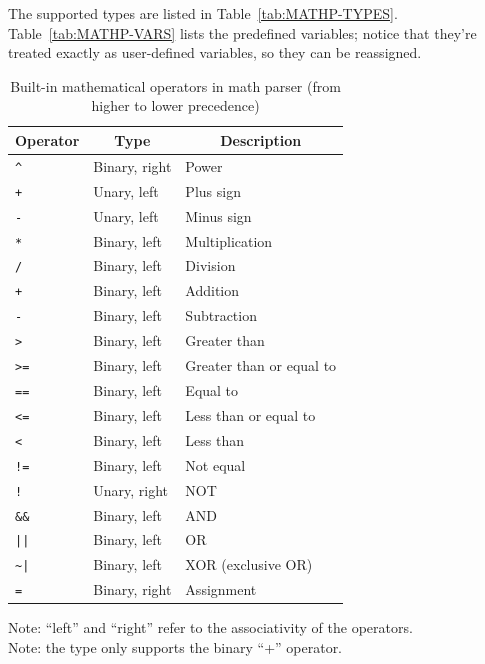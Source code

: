 The supported types are listed in Table~\ref{tab:MATHP-TYPES}.
Table~\ref{tab:MATHP-VARS} lists the predefined variables; notice
that they're treated exactly as user-defined variables, so they 
can be reassigned.

\begin{table}
	\begin{center}
	\caption{Built-in mathematical operators in math parser
	(from higher to lower precedence)}\label{tab:MATHP-OPERATORS}
	\begin{tabular}{lll}
		\hline
		\multicolumn{1}{c}{\textbf{Operator}} & 
		\multicolumn{1}{c}{\textbf{Type}} &
		\multicolumn{1}{c}{\textbf{Description}} \\
		\hline
		\texttt{\^} & Binary, right & Power \\
		\texttt{+} & Unary, left & Plus sign \\
		\texttt{-} & Unary, left & Minus sign \\
		\texttt{*} & Binary, left & Multiplication \\
		\texttt{/} & Binary, left & Division \\
		\texttt{+} & Binary, left & Addition \\
		\texttt{-} & Binary, left & Subtraction \\
		\texttt{>} & Binary, left & Greater than \\
		\texttt{>=} & Binary, left & Greater than or equal to \\
		\texttt{==} & Binary, left & Equal to \\
		\texttt{<=} & Binary, left & Less than or equal to \\
		\texttt{<} & Binary, left & Less than \\
		\texttt{!=} & Binary, left & Not equal \\
		\texttt{!} & Unary, right & NOT \\
		\texttt{\&\&} & Binary, left & AND \\
		\texttt{||} & Binary, left & OR \\
		\texttt{\~{}|} & Binary, left & XOR (exclusive OR) \\
		\texttt{=} & Binary, right & Assignment \\
		\hline
	\end{tabular}
	\end{center}
	\footnotesize
	Note: ``left'' and ``right'' refer to the associativity
	of the operators. \\
	Note: the  type only supports the binary ``+'' operator.
\end{table}

